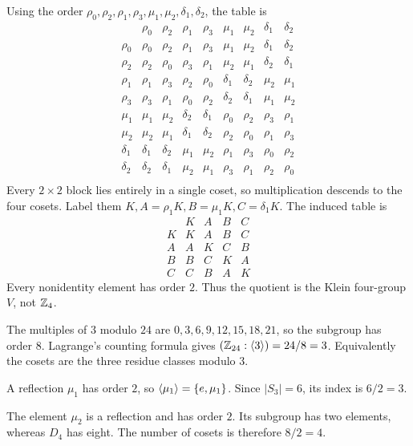 Using the order $\rho_0,\rho_2,\rho_1,\rho_3,\mu_1,\mu_2,\delta_1,\delta_2$, the table is
\[\begin{array}{c|cccccccc} & \rho_0 & \rho_2 & \rho_1 & \rho_3 & \mu_1 & \mu_2 & \delta_1 & \delta_2\\\hline
\rho_0 & \rho_0 & \rho_2 & \rho_1 & \rho_3 & \mu_1 & \mu_2 & \delta_1 & \delta_2\\
\rho_2 & \rho_2 & \rho_0 & \rho_3 & \rho_1 & \mu_2 & \mu_1 & \delta_2 & \delta_1\\
\rho_1 & \rho_1 & \rho_3 & \rho_2 & \rho_0 & \delta_1 & \delta_2 & \mu_2 & \mu_1\\
\rho_3 & \rho_3 & \rho_1 & \rho_0 & \rho_2 & \delta_2 & \delta_1 & \mu_1 & \mu_2\\
\mu_1 & \mu_1 & \mu_2 & \delta_2 & \delta_1 & \rho_0 & \rho_2 & \rho_3 & \rho_1\\
\mu_2 & \mu_2 & \mu_1 & \delta_1 & \delta_2 & \rho_2 & \rho_0 & \rho_1 & \rho_3\\
\delta_1 & \delta_1 & \delta_2 & \mu_1 & \mu_2 & \rho_1 & \rho_3 & \rho_0 & \rho_2\\
\delta_2 & \delta_2 & \delta_1 & \mu_2 & \mu_1 & \rho_3 & \rho_1 & \rho_2 & \rho_0\\\end{array}\]
Every $2\times2$ block lies entirely in a single coset, so multiplication descends to the four cosets. Label them $K,A=\rho_1K,B=\mu_1K,C=\delta_1K$. The induced table is
\[\begin{array}{c|cccc}&K&A&B&C\\\hline K&K&A&B&C\\A&A&K&C&B\\B&B&C&K&A\\C&C&B&A&K\end{array}\]
Every nonidentity element has order $2$. Thus the quotient is the Klein four-group $V$, not $\mathbb{Z}_4$.

The multiples of $3$ modulo $24$ are $0,3,6,9,12,15,18,21$, so the subgroup has order $8$. Lagrange's counting formula gives $(\mathbb{Z}_{24}:\langle 3\rangle)=24/8=3$. Equivalently the cosets are the three residue classes modulo $3$.

A reflection $\mu_1$ has order $2$, so $\langle \mu_1\rangle=\{e,\mu_1\}$. Since $|S_3|=6$, its index is $6/2=3$.

The element $\mu_2$ is a reflection and has order $2$. Its subgroup has two elements, whereas $D_4$ has eight. The number of cosets is therefore $8/2=4$.

